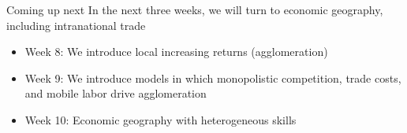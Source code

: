 \documentclass[10pt,notes=hide]{beamer}
\begin{document}
\begin{frame}{Coming up next}
In the next three weeks, we will turn to economic geography, including intranational trade
\begin{itemize}
\item Week 8: We introduce local increasing returns (agglomeration)
\item Week 9: We introduce models in which  monopolistic competition, trade costs, and mobile labor drive agglomeration
\item Week 10: Economic geography with heterogeneous skills
\end{itemize}
\end{frame}
\end{document}
